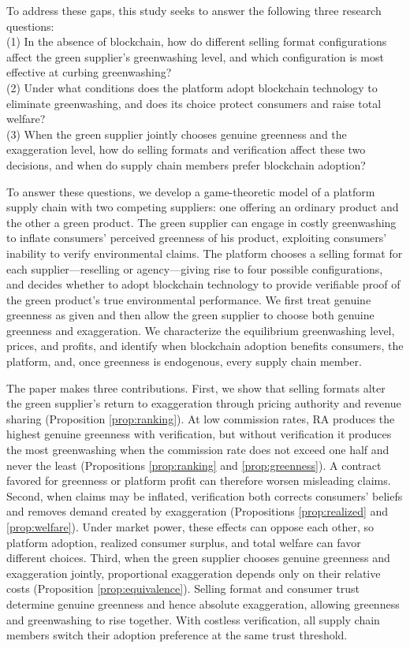 \documentclass[preprint,review,12pt,authoryear,nopreprintline]{elsarticle}
\theoremstyle{definition}
\begin{document}
To address these gaps, this study seeks to answer the following three research questions:\\
(1) In the absence of blockchain, how do different selling format configurations affect the green supplier's greenwashing level, and which configuration is most effective at curbing greenwashing?\\
(2) Under what conditions does the platform adopt blockchain technology to eliminate greenwashing, and does its choice protect consumers and raise total welfare?\\
(3) When the green supplier jointly chooses genuine greenness and the exaggeration level, how do selling formats and verification affect these two decisions, and when do supply chain members prefer blockchain adoption?

To answer these questions, we develop a game-theoretic model of a platform supply chain with two competing suppliers: one offering an ordinary product and the other a green product. The green supplier can engage in costly greenwashing to inflate consumers' perceived greenness of his product, exploiting consumers' inability to verify environmental claims. The platform chooses a selling format for each supplier---reselling or agency---giving rise to four possible configurations, and decides whether to adopt blockchain technology to provide verifiable proof of the green product's true environmental performance. We first treat genuine greenness as given and then allow the green supplier to choose both genuine greenness and exaggeration. We characterize the equilibrium greenwashing level, prices, and profits, and identify when blockchain adoption benefits consumers, the platform, and, once greenness is endogenous, every supply chain member.

The paper makes three contributions. First, we show that selling formats alter the green supplier's return to exaggeration through pricing authority and revenue sharing (Proposition \ref{prop:ranking}). At low commission rates, RA produces the highest genuine greenness with verification, but without verification it produces the most greenwashing when the commission rate does not exceed one half and never the least (Propositions \ref{prop:ranking} and \ref{prop:greenness}). A contract favored for greenness or platform profit can therefore worsen misleading claims. Second, when claims may be inflated, verification both corrects consumers' beliefs and removes demand created by exaggeration (Propositions \ref{prop:realized} and \ref{prop:welfare}). Under market power, these effects can oppose each other, so platform adoption, realized consumer surplus, and total welfare can favor different choices. Third, when the green supplier chooses genuine greenness and exaggeration jointly, proportional exaggeration depends only on their relative costs (Proposition \ref{prop:equivalence}). Selling format and consumer trust determine genuine greenness and hence absolute exaggeration, allowing greenness and greenwashing to rise together. With costless verification, all supply chain members switch their adoption preference at the same trust threshold.
\end{document}
